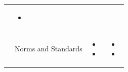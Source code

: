 \begin{table}
\begin{small}
\begin{supertabular}{>{}p{.02\textwidth}|>{\raggedright}p{.105\textwidth}>{\raggedright}p{.4\textwidth}>{\raggedright}p{.4\textwidth}}
\begin{itemize}
				\end{itemize}         
			& 
				\begin{itemize}
					\item  
				\end{itemize}         
 			 \tabularnewline {}
			& Norms and Standards & 
				\begin{itemize}
					\item 
					\item  
				\end{itemize}         
			& 
				\begin{itemize}
					\item 
					\item  
				\end{itemize}   
 			 \tabularnewline 					
			\bottomrule
		\end{supertabular}
	\end{small}
	
\end{table}


